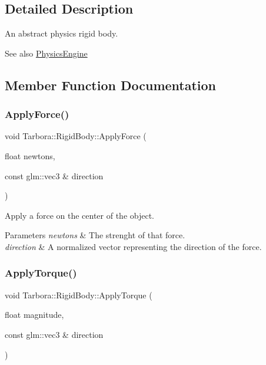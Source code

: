 \subsection{Detailed Description}
An abstract physics rigid body. 

\begin{DoxySeeAlso}{See also}
\hyperlink{classTarbora_1_1PhysicsEngine}{Physics\+Engine} 
\end{DoxySeeAlso}


\subsection{Member Function Documentation}
\mbox{\label{classTarbora_1_1RigidBody_ae60a0e3d1f035698dfc11a117c28999b}} 
\subsubsection{\texorpdfstring{Apply\+Force()}{ApplyForce()}}
{\footnotesize\ttfamily void Tarbora\+::\+Rigid\+Body\+::\+Apply\+Force (\begin{DoxyParamCaption}\item[{float}]{newtons,  }\item[{const glm\+::vec3 \&}]{direction }\end{DoxyParamCaption})}



Apply a force on the center of the object. 


\begin{DoxyParams}{Parameters}
{\em newtons} & The strenght of that force. \\
\hline
{\em direction} & A normalized vector representing the direction of the force. \\
\hline
\end{DoxyParams}
\mbox{\label{classTarbora_1_1RigidBody_a025666d2545230e12b546b68d955871c}} 
\subsubsection{\texorpdfstring{Apply\+Torque()}{ApplyTorque()}}
{\footnotesize\ttfamily void Tarbora\+::\+Rigid\+Body\+::\+Apply\+Torque (\begin{DoxyParamCaption}\item[{float}]{magnitude,  }\item[{const glm\+::vec3 \&}]{direction }\end{DoxyParamCaption})}



